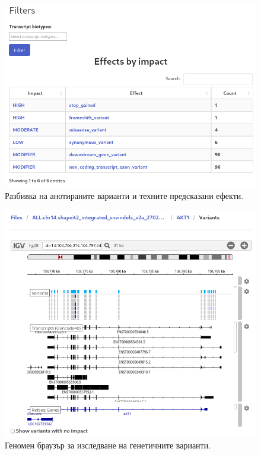 \documentclass[pdftex,cyrillic,14pt,a4page,twoside,openright]{extreport}
\begin{document}
\begin{figure}[ht]
  \centering
  \includegraphics[width=16cm]{figures/gene_summary_effects}
  \caption {Разбивка на анотираните варианти и техните предсказани ефекти.}
  \label{fig:gene_effects}
\end{figure}

\begin{figure}[ht]
  \centering
  \includegraphics[width=16cm]{figures/genome_browser}
  \caption {Геномен браузър за изследване на генетичните варианти.}
  \label{fig:genome_browser}
\end{figure}
\end{document}
